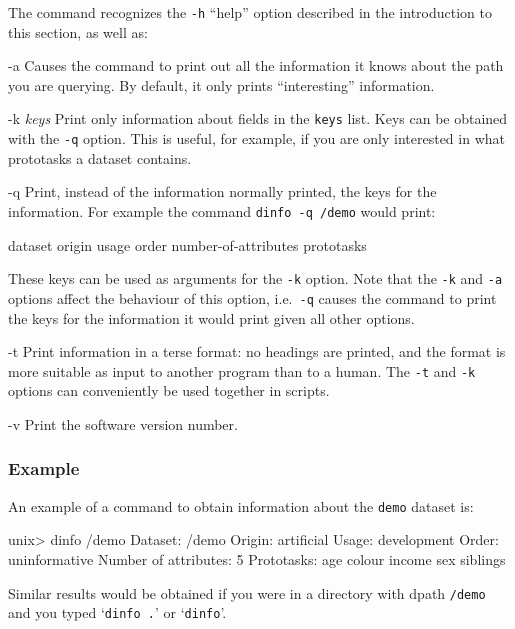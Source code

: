 The \dinfo{} command recognizes the \texttt{-h} ``help'' option described in
the introduction to this section, as well as:
\begin{ttdescription}
\item[-a] 
    Causes the command to print out all the information it knows about
    the path you are querying. By default, it only prints
    ``interesting'' information.
\item[-k \textit{keys}] 
    Print only information about fields in the \texttt{keys} list. Keys 
    can be obtained with the \texttt{-q} option. This is useful, for
    example, if you are only interested in what prototasks a dataset
    contains.
\item[-q] 
    Print, instead of the information normally printed, the keys for
    the information. For example the command \verb+dinfo -q /demo+
    would print:
\begin{Session}
dataset origin usage order number-of-attributes prototasks
\end{Session}
    These keys can be used as arguments for the \texttt{-k} option. Note
    that the \texttt{-k} and \texttt{-a} options affect the behaviour of
    this option, i.e.~\texttt{-q} causes the command to print the keys
    for the information it would print given all other options.
\item[-t] 
    Print information in a terse format: no headings are printed, and
    the format is more suitable as input to another program than to a
    human. The \texttt{-t} and \texttt{-k} options can conveniently be used
    together in scripts.
\item[-v] 
   Print the software version number.
\end{ttdescription}

\subsubsection*{Example}

An example of a command to obtain information about the \texttt{demo}
dataset is:
\begin{Session}
unix> dinfo /demo
Dataset: /demo
Origin: artificial
Usage: development
Order: uninformative
Number of attributes: 5
Prototasks: 
        age
        colour
        income
        sex
        siblings
\end{Session}
Similar results would be obtained if you were in a directory with
dpath \texttt{/demo} and you typed `\texttt{dinfo .}' or
`\texttt{dinfo}'.

